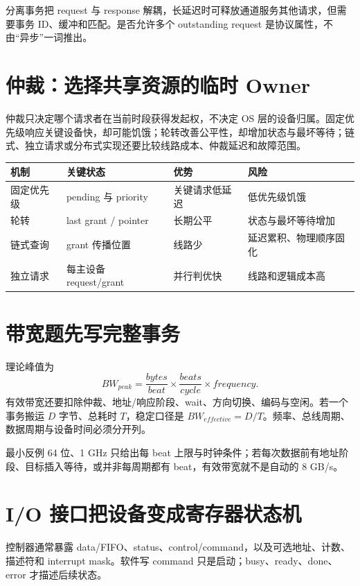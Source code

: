 \documentclass[UTF8,fontset=fandol,11pt,a4paper]{ctexart}
\begin{document}
分离事务把 request 与 response 解耦，长延迟时可释放通道服务其他请求，但需要事务 ID、缓冲和匹配。是否允许多个 outstanding request 是协议属性，不由“异步”一词推出。

\section{仲裁：选择共享资源的临时 Owner}
仲裁只决定哪个请求者在当前时段获得发起权，不决定 OS 层的设备归属。固定优先级响应关键设备快，却可能饥饿；轮转改善公平性，却增加状态与最坏等待；链式、独立请求或分布式实现还要比较线路成本、仲裁延迟和故障范围。

\begin{center}\small
\begin{tabularx}{\linewidth}{L{2.2cm}YYY}\toprule
机制 & 关键状态 & 优势 & 风险\\\midrule
固定优先级 & pending 与 priority & 关键请求低延迟 & 低优先级饥饿\\
轮转 & last grant / pointer & 长期公平 & 状态与最坏等待增加\\
链式查询 & grant 传播位置 & 线路少 & 延迟累积、物理顺序固化\\
独立请求 & 每主设备 request/grant & 并行判优快 & 线路和逻辑成本高\\
\bottomrule
\end{tabularx}
\end{center}

\section{带宽题先写完整事务}
理论峰值为
\[
BW_{peak}=\frac{bytes}{beat}\times\frac{beats}{cycle}\times frequency.
\]
有效带宽还要扣除仲裁、地址/响应阶段、wait、方向切换、编码与空闲。若一个事务搬运 $D$ 字节、总耗时 $T$，稳定口径是 $BW_{effective}=D/T$。频率、总线周期、数据周期与设备时间必须分开列。

\begin{warnbox}{最小反例}
64 位、1 GHz 只给出每 beat 上限与时钟条件；若每次数据前有地址阶段、目标插入等待，或并非每周期都有 beat，有效带宽就不是自动的 8 GB/s。
\end{warnbox}

\section{I/O 接口把设备变成寄存器状态机}
控制器通常暴露 data/FIFO、status、control/command，以及可选地址、计数、描述符和 interrupt mask。软件写 command 只是启动；busy、ready、done、error 才描述后续状态。
\end{document}
